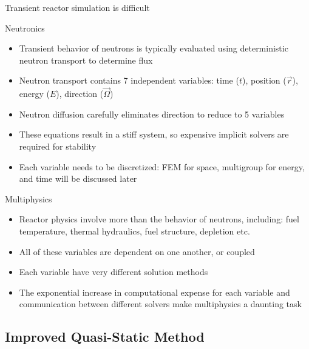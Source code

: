 \documentclass[8pt,xcolor=dvipnames]{beamer}
\newcommand{\vo}{\vec{\Omega}}
\newcommand{\vr}{\vec{r}}
\begin{document}
\begin{frame}{Transient reactor simulation is difficult}

\begin{block}{Neutronics}
\begin{itemize}
\item Transient behavior of neutrons is typically evaluated using deterministic neutron transport to determine flux
\item Neutron transport contains 7 independent variables: time ($t$), position ($\vr$), energy ($E$), direction ($\vo$)
\item Neutron diffusion carefully eliminates direction to reduce to 5 variables
\item These equations result in a stiff system, so expensive implicit solvers are required for stability
\item Each variable needs to be discretized: FEM for space, multigroup for energy, and time will be discussed later
\end{itemize}
\end{block}

\begin{block}{Multiphysics}
\begin{itemize}
\item Reactor physics involve more than the behavior of neutrons, including: fuel temperature, thermal hydraulics, fuel structure, depletion etc.
\item All of these variables are dependent on one another, or coupled
\item Each variable have very different solution methods
\item The exponential increase in computational expense for each variable and communication between different solvers make multiphysics a daunting task
\end{itemize}
\end{block}

\end{frame}

\subsection{Improved Quasi-Static Method}
\end{document}
